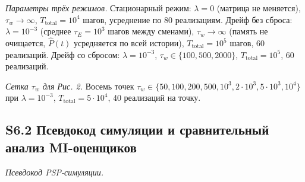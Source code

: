 \documentclass[pdflatex,sn-mathphys-ay]{sn-jnl}
\begin{document}
\emph{Параметры трёх режимов.} Стационарный режим: \(\lambda = 0\) (матрица не меняется), \(\tau_w \to \infty\), \(T_{\text{total}} = 10^4\) шагов, усреднение по 80 реализациям. Дрейф без сброса: \(\lambda = 10^{-3}\) (среднее \(\tau_E = 10^3\) шагов между сменами), \(\tau_w \to \infty\) (память не очищается, \(\hat{P}(t)\) усредняется по всей истории), \(T_{\text{total}} = 10^5\) шагов, 60 реализаций. Дрейф со сбросом: \(\lambda = 10^{-3}\), \(\tau_w \in \{100, 500, 2000\}\), \(T_{\text{total}} = 10^5\), 60 реализаций.



\emph{Сетка \(\tau_w\) для Рис. 2.} Восемь точек \(\tau_w \in \{50, 100, 200, 500, 10^3, 2\cdot 10^3, 5\cdot 10^3, 10^4\}\) при \(\lambda = 10^{-3}\), \(T_{\text{total}} = 5 \cdot 10^4\), 40 реализаций на точку.



\subsection*{S6.2 Псевдокод симуляции и сравнительный анализ MI-оценщиков}\label{s6.2-ux43fux441ux435ux432ux434ux43eux43aux43eux434-ux441ux438ux43cux443ux43bux44fux446ux438ux438-ux438-ux441ux440ux430ux432ux43dux438ux442ux435ux43bux44cux43dux44bux439-ux430ux43dux430ux43bux438ux437-mi-ux43eux446ux435ux43dux449ux438ux43aux43eux432}



\emph{Псевдокод PSP-симуляции.}
\end{document}

